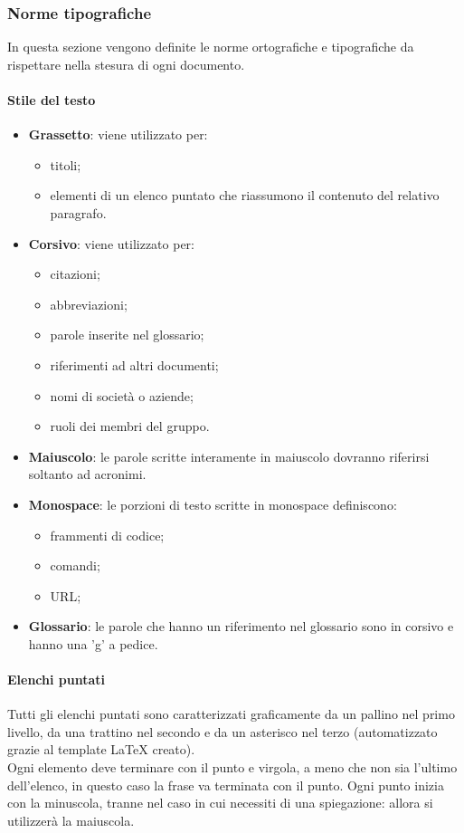 \subsubsection{Norme tipografiche}
In questa sezione vengono definite le norme ortografiche e tipografiche da rispettare nella stesura di ogni documento.
 \paragraph{Stile del testo} 
\begin{itemize}
	\item \textbf{Grassetto}: viene utilizzato per:
	\begin{itemize}
		\item titoli;
		\item elementi di un elenco puntato che riassumono il contenuto del relativo paragrafo.
	\end{itemize}
	\item \textbf{Corsivo}: viene utilizzato per:
	\begin{itemize}
		\item citazioni;
		\item abbreviazioni;
		\item parole inserite nel glossario;
		\item riferimenti ad altri documenti;
		\item nomi di società o aziende;
		\item ruoli dei membri del gruppo.
	\end{itemize}
	\item \textbf{Maiuscolo}: le parole scritte interamente in maiuscolo dovranno riferirsi soltanto ad acronimi.
	\item \textbf{Monospace}: le porzioni di testo scritte in monospace definiscono:
	\begin{itemize}
		\item frammenti di codice;
		\item comandi;
		\item URL;
	\end{itemize}
	\item \textbf{Glossario}: le parole che hanno un riferimento nel glossario sono in corsivo e hanno una 'g' a pedice.
\end{itemize}
 \paragraph{Elenchi puntati}
Tutti gli elenchi puntati sono caratterizzati graficamente da un pallino nel primo livello, da una trattino nel secondo e da un asterisco nel terzo (automatizzato grazie al template \LaTeX{} creato). \\
Ogni elemento deve terminare con il punto e virgola, a meno che non sia l'ultimo dell'elenco, in questo caso la frase va terminata con il punto. Ogni punto inizia con la minuscola, tranne nel caso in cui necessiti di una spiegazione: allora
si utilizzerà la maiuscola.
